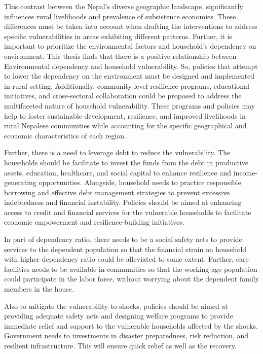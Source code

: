 \documentclass[12pt, a4paper]{article}
\begin{document}
This contrast between the Nepal's diverse geographic landscape, significantly influences rural livelihoods and prevalence of subsistence economies. These differences must be taken into account when drafting the interventions to address specific vulnerabilities in areas exhibiting different patterns. Further, it is important to prioritize the environmental factors and household's dependency on environment. This thesis finds that there is a positive relationship between Environmental dependency and household vulnerability. So, policies that attempt to lower the dependency on the environment must be designed and implemented in rural setting. Additionally, community-level resilience programs, educational initiatives, and cross-sectoral collaboration could be proposed to address the multifaceted nature of household vulnerability.  These programs and policies may help to foster sustainable development, resilience, and improved livelihoods in rural Nepalese communities while accounting for the specific geographical and economic characteristics of each region. 

Further, there is a need to leverage debt to reduce the vulnerability. The households should be facilitate to invest the funds from the debt in productive assets, education, healthcare, and social capital to enhance resilience and income-generating opportunities. Alongside, household needs to practice responsible borrowing and effective debt management strategies to prevent excessive indebtedness and financial instability. Policies should be aimed at enhancing access to credit and financial services for the vulnerable households to facilitate economic empowerment and resilience-building initiatives.

In part of dependency ratio, there needs to be a social safety nets to provide services to the dependent population so that the financial strain on household with higher dependency ratio could be alleviated to some extent. Further, care facilities needs to be available in communities so that the working age population could participate in the labor force, without worrying about the dependent family members in the house. 

Also to mitigate the vulnerability to shocks, policies should be aimed at providing adequate safety nets and designing welfare programs to provide immediate relief and support to the vulnerable households affected by the shocks. Government needs to investments in disaster preparedness, risk reduction, and resilient infrastructure. This will ensure quick relief as well as the recovery.   
\end{document}
